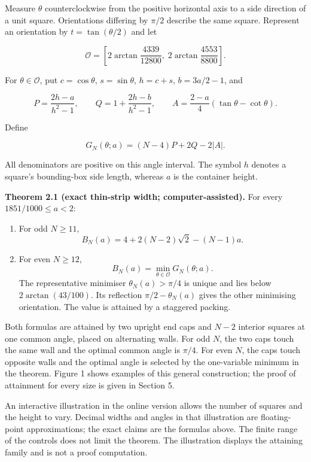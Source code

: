 \documentclass[
  11pt,
  a4paper,
]{article}
\providecommand{\tightlist}{%
  \setlength{\itemsep}{0pt}\setlength{\parskip}{0pt}}
\begin{document}
Measure \(\theta\) counterclockwise from the positive horizontal axis to
a side direction of a unit square. Orientations differing by \(\pi/2\)
describe the same square. Represent an orientation by
\(t=\tan(\theta/2)\) and let

\[
\mathcal O=\left[2\arctan\frac{4339}{12800},\;2\arctan\frac{4553}{8800}\right].
\]

For \(\theta\in\mathcal O\), put \(c=\cos\theta\), \(s=\sin\theta\),
\(h=c+s\), \(b=3a/2-1\), and

\[
P=\frac{2h-a}{h^2-1},\qquad
Q=1+\frac{2h-b}{h^2-1},\qquad
A=\frac{2-a}{4}(\tan\theta-\cot\theta).
\]

Define

\[
G_N(\theta;a)=(N-4)P+2Q-2|A|.
\]

All denominators are positive on this angle interval. The symbol \(h\)
denotes a square's bounding-box side length, whereas \(a\) is the
container height.

\textbf{Theorem 2.1 (exact thin-strip width; computer-assisted).} For
every \(1851/1000\le a<2\):

\begin{enumerate}
\def\labelenumi{\arabic{enumi}.}
\tightlist
\item
  For odd \(N\ge11\), \[
  B_N(a)=4+2(N-2)\sqrt2-(N-1)a.
  \]
\item
  For even \(N\ge12\), \[
  B_N(a)=\min_{\theta\in\mathcal O}G_N(\theta;a).
  \] The representative minimiser \(\theta_N(a)>\pi/4\) is unique and
  lies below \(2\arctan(43/100)\). Its reflection \(\pi/2-\theta_N(a)\)
  gives the other minimising orientation. The value is attained by a
  staggered packing.
\end{enumerate}

Both formulas are attained by two upright end caps and \(N-2\) interior
squares at one common angle, placed on alternating walls. For odd \(N\),
the two caps touch the same wall and the optimal common angle is
\(\pi/4\). For even \(N\), the caps touch opposite walls and the optimal
angle is selected by the one-variable minimum in the theorem. Figure 1
shows examples of this general construction; the proof of attainment for
every size is given in Section 5.

An interactive illustration in the online version allows the number of
squares and the height to vary. Decimal widths and angles in that
illustration are floating-point approximations; the exact claims are the
formulas above. The finite range of the controls does not limit the
theorem. The illustration displays the attaining family and is not a
proof computation.
\end{document}
